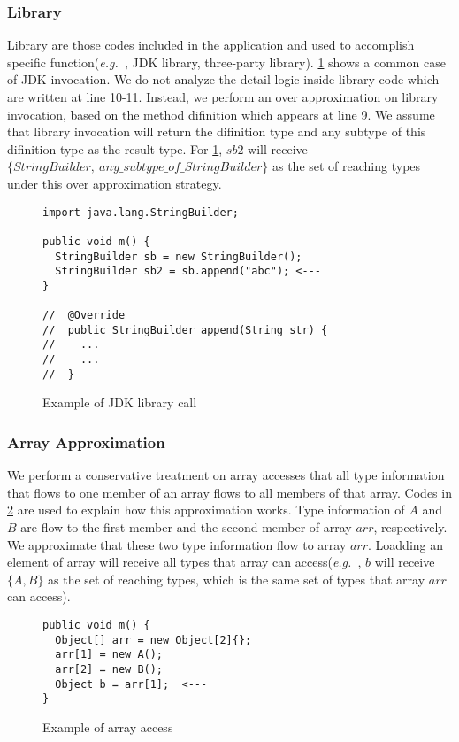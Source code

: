 \documentclass{fac}
\newcommand\eg{\textit{e.g.\ }}
\begin{document}
\subsubsection{Library}\label{subsubsec:library}
Library are those codes included in the application and used to accomplish specific function(\eg, JDK library, three-party library). \ref{fig:jdk} shows a common case of JDK invocation. We do not analyze the detail logic inside library code which are written at line 10-11. Instead, we perform an over approximation on library invocation, based on the method difinition which appears at line 9. We assume that library invocation will return the difinition type and any subtype of this difinition type as the result type. For \ref{fig:jdk}, $sb2$ will receive $\{StringBuilder,\ any\_subtype\_of\_StringBuilder\}$ as the set of reaching types under this over approximation strategy.

\begin{figure}
\begin{lstlisting}
import java.lang.StringBuilder;

public void m() {
  StringBuilder sb = new StringBuilder();
  StringBuilder sb2 = sb.append("abc"); <---
}

//  @Override
//  public StringBuilder append(String str) {
//    ...
//    ...
//  }
\end{lstlisting}
\caption{Example of JDK library call}
\label{fig:jdk}
\end{figure}

\subsubsection{Array Approximation}\label{subsubsec:array-approximation}
We perform a conservative treatment on array accesses that all type information that flows to one member of an array flows to all members of that array. Codes in \ref{fig:array} are used to explain how this approximation works. Type information of $A$ and $B$ are flow to the first member and the second member of array $arr$, respectively. We approximate that these two type information flow to array $arr$. Loadding an element of array will receive all types that array can access(\eg, $b$ will receive $\{A, B\}$ as the set of reaching types, which is the same set of types that array $arr$ can access).

\begin{figure}
\begin{lstlisting}
public void m() {
  Object[] arr = new Object[2]{};
  arr[1] = new A();
  arr[2] = new B();
  Object b = arr[1];  <---
}
\end{lstlisting}
\caption{Example of array access}
\label{fig:array}
\end{figure}
\end{document}
